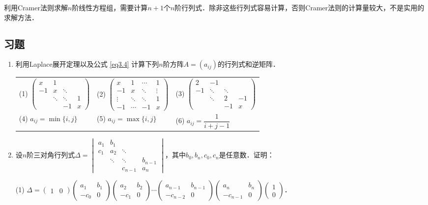 \documentclass[a4paper,fontset=windows]{ctexbook}
\theoremstyle{definition}
\begin{document}
利用Cramer法则求解$n$阶线性方程组，需要计算$n+1$个$n$阶行列式．除非这些行列式容易计算，否则Cramer法则的计算量较大，不是实用的求解方法．

\subsection*{习题}

\begin{enumerate}
\item 利用Laplace展开定理以及公式 \eqref{eq3.4} 计算下列$n$阶方阵$A=(a_{ij})$的行列式和逆矩阵．

\hspace*{-6pt}\begin{tabular}{l@{\qquad}l@{\qquad}l}
(1) $\begin{pmatrix}x&1&& \\ -1&x&\ddots& \\ &\ddots&\ddots&1 \\ &&-1&x\end{pmatrix}$ &
(2) $\begin{pmatrix}x&1&\cdots&1 \\ -1&x&\ddots&\vdots \\ \vdots&\ddots&\ddots&1 \\ -1&\cdots&-1&x\end{pmatrix}$ &
(3) $\begin{pmatrix}2&-1&& \\ -1&\ddots&\ddots& \\ &\ddots&2&-1 \\ &&-1&x\end{pmatrix}$ \\
(4) $a_{ij}=\min\{i,j\}$ &
(5) $a_{ij}=\max\{i,j\}$ &
(6) $a_{ij}=\dfrac{1}{i+j-1}$
\end{tabular}

\item 设$n$阶三对角行列式$\Delta=\begin{vmatrix}a_1&b_1&& \\ c_1&a_2&\ddots& \\ &\ddots&\ddots&b_{n-1} \\ &&c_{n-1}&a_n\end{vmatrix}$，其中$b_0,b_n,c_0,c_n$是任意数．证明：

(1) $\Delta=\begin{pmatrix}1&0\end{pmatrix}\begin{pmatrix}a_1&b_1 \\ -c_0&0\end{pmatrix}\begin{pmatrix}a_2&b_2 \\ -c_1&0\end{pmatrix}\cdots\begin{pmatrix}a_{n-1}&b_{n-1} \\ -c_{n-2}&0\end{pmatrix}\begin{pmatrix}a_n&b_n \\ -c_{n-1}&0\end{pmatrix}\begin{pmatrix}1 \\ 0\end{pmatrix}$．


\end{enumerate}
\end{document}
